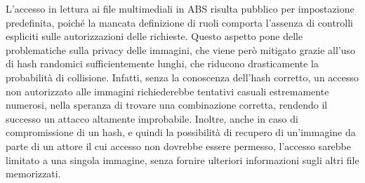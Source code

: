 L'accesso in lettura ai file multimediali in ABS risulta pubblico per impostazione predefinita, 
poiché la mancata definizione di ruoli comporta l'assenza di controlli espliciti sulle autorizzazioni delle richieste. 
Questo aspetto pone delle problematiche sulla privacy delle immagini, 
che viene però mitigato grazie all'uso di hash randomici sufficientemente lunghi, 
che riducono drasticamente la probabilità di collisione. 
Infatti, senza la conoscenza dell'hash corretto, 
un accesso non autorizzato alle immagini 
richiederebbe tentativi casuali estremamente numerosi,
nella speranza di trovare una combinazione corretta, 
rendendo il successo un attacco altamente improbabile. 
Inoltre, anche in caso di compromissione di un hash, 
e quindi la possibilità di recupero di un'immagine da parte di un attore 
il cui accesso non dovrebbe essere permesso,
l'accesso sarebbe limitato a una singola immagine, 
senza fornire ulteriori informazioni sugli altri file memorizzati.
\clearpage